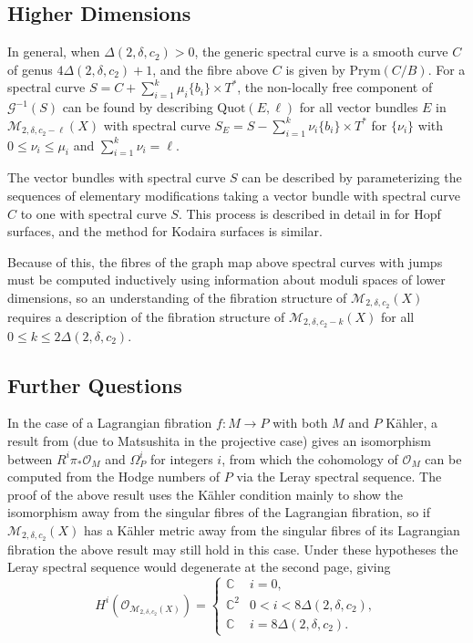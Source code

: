 \documentclass{article}[12pt]
\theoremstyle{definition}
\theoremstyle{remark}
\newcommand \C{\mathbb C}
\numberwithin{equation}{section}
\newcommand \mc{\mathcal}
\begin{document}
\subsection{Higher Dimensions}
In general, when $\Delta(2,\delta,c_2)>0$, the generic spectral curve is a smooth curve $C$ of genus $4\Delta(2,\delta,c_2)+1$, and the fibre above $C$ is given by $\text{Prym}(C/B)$. For a spectral curve $S=C+\sum\limits_{i=1}^k \mu_i\{b_i\}\times T^*$, the non-locally free component of $\mc{G}^{-1}(S)$ can be found by describing $\text{Quot}(E,\ell)$ for all vector bundles $E$ in $\mc{M}_{2,\delta,c_2-\ell}(X)$ with spectral curve $S_E=S-\sum\limits_{i=1}^k \nu_i \{b_i\}\times T^*$ for $\{\nu_i\}$ with $0\leq \nu_i\leq \mu_i$ and $\sum\limits_{i=1}^k \nu_i=\ell$.

The vector bundles with spectral curve $S$ can be described by parameterizing the sequences of elementary modifications taking a vector bundle with spectral curve $C$ to one with spectral curve $S$. This process is described in detail in \cite[Section 4]{MorHopf} for Hopf surfaces, and the method for Kodaira surfaces is similar.

Because of this, the fibres of the graph map above spectral curves with jumps must be computed inductively using information about moduli spaces of lower dimensions, so an understanding of the fibration structure of $\mc{M}_{2,\delta,c_2}(X)$ requires a description of the fibration structure of $\mc{M}_{2,\delta,c_2-k}(X)$ for all $0\leq k\leq 2\Delta(2,\delta,c_2)$.

\subsection{Further Questions}
In the case of a Lagrangian fibration $f:M\to P$ with both $M$ and $P$ K\"ahler, a result from \cite{SoldVerb} (due to Matsushita \cite{Matsushita} in the projective case) gives an isomorphism between $R^i\pi_*\mc{O}_M$ and $\Omega^i_P$ for integers $i$, from which the cohomology of $\mc{O}_M$ can be computed from the Hodge numbers of $P$ via the Leray spectral sequence. The proof of the above result uses the K\"ahler condition mainly to show the isomorphism away from the singular fibres of the Lagrangian fibration, so if $\mc{M}_{2,\delta,c_2}(X)$ has a K\"ahler metric away from the singular fibres of its Lagrangian fibration the above result may still hold in this case. Under these hypotheses the Leray spectral sequence would degenerate at the second page, giving $$H^i(\mc{O}_{\mc{M}_{2,\delta,c_2}(X)})=\begin{cases}\C & i=0,\\
\C^2 & 0<i<8\Delta(2,\delta,c_2),\\
\C & i=8\Delta(2,\delta,c_2).
\end{cases}$$
\end{document}
